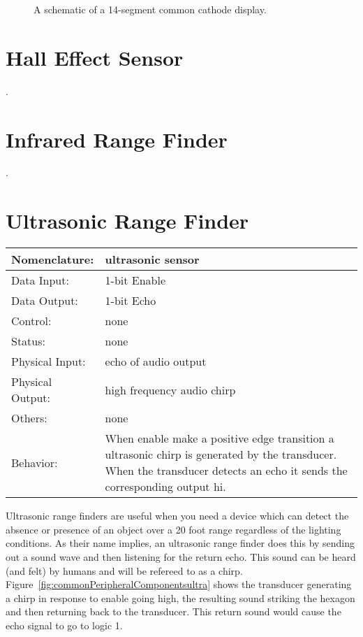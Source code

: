 \begin{figure}[ht]
\caption{A schematic of a 14-segment common cathode display.}
\label{fig:commonPeripheralComponentscommon}
\end{figure}


\section{Hall Effect Sensor}
\pagebreak
.

\section{Infrared Range Finder}
\pagebreak
.

\section{Ultrasonic Range Finder}
\label{page:ultrasonic}
\begin{tabular}{|l|p{3.5in}|} \hline
Nomenclature:  & ultrasonic sensor  \\ \hline
Data Input:    & 1-bit Enable     \\ \hline
Data Output:   & 1-bit Echo   \\ \hline
Control:       & none           \\ \hline
Status:        & none                                   \\ \hline
Physical Input:& echo of audio output		\\ \hline
Physical Output:& high frequency audio chirp		\\ \hline
Others:        & none                   \\ \hline
Behavior:      & When enable make a positive edge transition
a ultrasonic chirp is generated by the transducer.  When the 
transducer detects an echo it sends the corresponding output hi. \\ \hline
\end{tabular}

Ultrasonic range finders are useful when you need a device which
can detect the absence or presence of an object over a 20 foot
range regardless of the lighting conditions.   As their name implies, 
an ultrasonic range finder does this by sending out a sound wave
and then listening for the return echo.  This sound can be heard (and
felt) by humans and will be refereed to as a chirp.
Figure~\ref{fig:commonPeripheralComponentsultra} shows the transducer generating a chirp in
response to enable going high, the resulting sound striking the 
hexagon and then returning back to the transducer.  This return
sound would cause the echo signal to go to logic 1.

